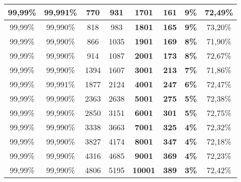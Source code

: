 \begin{table}[hbtp]
{\begin{tabular}{cccc
>{\columncolor[HTML]{8D3CE1}}c 
>{\columncolor[HTML]{5754D6}}c 
>{\columncolor[HTML]{8FFFFB}}c c}
99,99\% & 99,991\% & 770 & 931 & \textbf{1701} & \textbf{161} & \textbf{9\%} & 72,49\% \\ \hline
\cellcolor[HTML]{C0C0C0}99,99\% & \cellcolor[HTML]{C0C0C0}99,990\% & \cellcolor[HTML]{C0C0C0}818 & \cellcolor[HTML]{C0C0C0}983 & \textbf{1801} & \textbf{165} & \textbf{9\%} & \cellcolor[HTML]{C0C0C0}73,20\% \\ \hline
99,99\% & 99,990\% & 866 & 1035 & \textbf{1901} & \textbf{169} & \textbf{8\%} & 71,90\% \\ \hline
\cellcolor[HTML]{C0C0C0}99,99\% & \cellcolor[HTML]{C0C0C0}99,990\% & \cellcolor[HTML]{C0C0C0}914 & \cellcolor[HTML]{C0C0C0}1087 & \textbf{2001} & \textbf{173} & \textbf{8\%} & \cellcolor[HTML]{C0C0C0}72,67\% \\ \hline
99,99\% & 99,990\% & 1394 & 1607 & \textbf{3001} & \textbf{213} & \textbf{7\%} & 71,86\% \\ \hline
\cellcolor[HTML]{C0C0C0}99,99\% & \cellcolor[HTML]{C0C0C0}99,991\% & \cellcolor[HTML]{C0C0C0}1877 & \cellcolor[HTML]{C0C0C0}2124 & \textbf{4001} & \textbf{247} & \textbf{6\%} & \cellcolor[HTML]{C0C0C0}72,47\% \\ \hline
99,99\% & 99,990\% & 2363 & 2638 & \textbf{5001} & \textbf{275} & \textbf{5\%} & 72,38\% \\ \hline
\cellcolor[HTML]{C0C0C0}99,99\% & \cellcolor[HTML]{C0C0C0}99,990\% & \cellcolor[HTML]{C0C0C0}2850 & \cellcolor[HTML]{C0C0C0}3151 & \textbf{6001} & \textbf{301} & \textbf{5\%} & \cellcolor[HTML]{C0C0C0}72,75\% \\ \hline
99,99\% & 99,990\% & 3338 & 3663 & \textbf{7001} & \textbf{325} & \textbf{4\%} & 72,32\% \\ \hline
\cellcolor[HTML]{C0C0C0}99,99\% & \cellcolor[HTML]{C0C0C0}99,990\% & \cellcolor[HTML]{C0C0C0}3827 & \cellcolor[HTML]{C0C0C0}4174 & \textbf{8001} & \textbf{347} & \textbf{4\%} & \cellcolor[HTML]{C0C0C0}72,18\% \\ \hline
99,99\% & 99,990\% & 4316 & 4685 & \textbf{9001} & \textbf{369} & \textbf{4\%} & 72,23\% \\ \hline
\cellcolor[HTML]{C0C0C0}99,99\% & \cellcolor[HTML]{C0C0C0}99,990\% & \cellcolor[HTML]{C0C0C0}4806 & \cellcolor[HTML]{C0C0C0}5195 & \textbf{10001} & \textbf{389} & \textbf{3\%} & \cellcolor[HTML]{C0C0C0}72,42\% \\ \hline
\end{tabular}%
}
\end{table}
